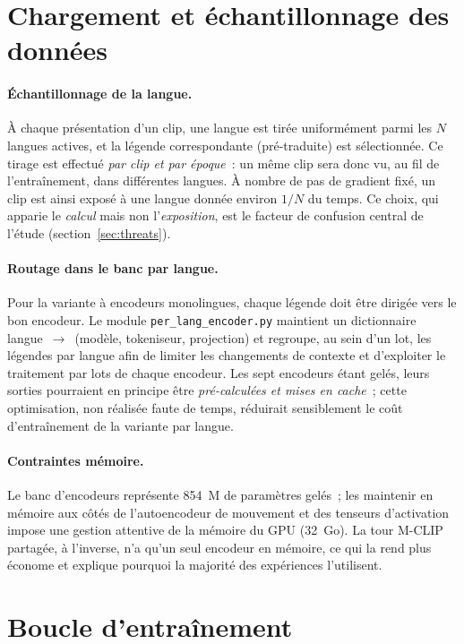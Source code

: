 \documentclass[12pt,a4paper,oneside]{report}
\theoremstyle{definition}
\theoremstyle{plain}
\begin{document}
\section{Chargement et échantillonnage des données}
\label{sec:chargement}

\paragraph{Échantillonnage de la langue.} À chaque présentation d'un clip, une
langue est tirée uniformément parmi les $N$ langues actives, et la légende
correspondante (pré-traduite) est sélectionnée. Ce tirage est effectué \emph{par
clip et par époque}~: un même clip sera donc vu, au fil de l'entraînement, dans
différentes langues. À nombre de pas de gradient fixé, un clip est ainsi exposé à
une langue donnée environ $1/N$ du temps. Ce choix, qui apparie le \emph{calcul}
mais non l'\emph{exposition}, est le facteur de confusion central de l'étude
(section~\ref{sec:threats}).

\paragraph{Routage dans le banc par langue.} Pour la variante à encodeurs
monolingues, chaque légende doit être dirigée vers le bon encodeur. Le module
\texttt{per\_lang\_encoder.py} maintient un dictionnaire langue~$\rightarrow$~(modèle,
tokeniseur, projection) et regroupe, au sein d'un lot, les légendes par langue afin
de limiter les changements de contexte et d'exploiter le traitement par lots de
chaque encodeur. Les sept encodeurs étant gelés, leurs sorties pourraient en
principe être \emph{pré-calculées et mises en cache}~; cette optimisation, non
réalisée faute de temps, réduirait sensiblement le coût d'entraînement de la
variante par langue.

\paragraph{Contraintes mémoire.} Le banc d'encodeurs représente 854~M de paramètres
gelés~; les maintenir en mémoire aux côtés de l'autoencodeur de mouvement et des
tenseurs d'activation impose une gestion attentive de la mémoire du GPU (32~Go). La
tour M-CLIP partagée, à l'inverse, n'a qu'un seul encodeur en mémoire, ce qui la
rend plus économe et explique pourquoi la majorité des expériences l'utilisent.

\section{Boucle d'entraînement}
\label{sec:boucle}
\end{document}
